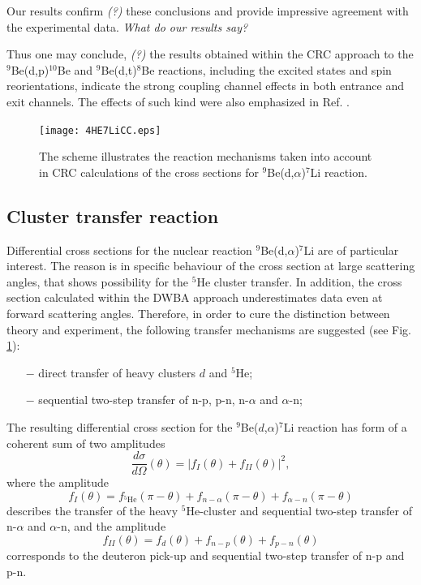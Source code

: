 \documentclass[10pt]{iopart}
\begin{document}
Our results confirm \textit{(?)} these conclusions and provide impressive agreement with the experimental data. \textit{What do our results say?}

Thus one may conclude, \textit{(?)} the results obtained within the CRC approach to the ${}^9$Be(d,p)${}^{10}$Be and ${}^9$Be(d,t)${}^{8}$Be reactions, including the excited states and spin reorientations, indicate the strong coupling channel effects in both entrance and exit channels. The effects of such kind were also emphasized in Ref. \cite{harakeh1980, rudchik2016}.

\begin{figure}[tp]
\centering
\texttt{[image: 4HE7LiCC.eps]}
\caption{\label{4He7LICC} The scheme illustrates the reaction mechanisms taken into account in CRC calculations of the cross sections for ${}^9$Be(d,$\alpha$)${}^7$Li reaction.}
\end{figure}	

\subsection{Cluster transfer reaction}
Differential cross sections for the nuclear reaction ${^9}$Be(d,$\alpha$)${}^7$Li are of particular interest. The reason is in specific behaviour of the cross section at large scattering angles, that shows possibility for the ${}^5$He cluster transfer. In addition, the cross section calculated within the DWBA approach underestimates data even at forward scattering angles. Therefore, in order to cure the distinction between theory and experiment, the following transfer mechanisms are suggested (see Fig. \ref{4He7LICC}):
\begin{itemize}
\item[$-$] direct transfer of heavy clusters $d$ and ${}^5$He;
\item[$-$] sequential two-step transfer of n-p, p-n, n-$\alpha$ and $\alpha$-n;
\end{itemize}

The resulting differential cross section for the ${^9}$Be($d$,$\alpha$)${}^7$Li reaction has form of a coherent sum of two amplitudes
\begin{equation}
\frac{d\sigma}{d\Omega}(\theta) =\vert f_{I}(\theta) + f_{II}(\theta) \vert ^2,
\end{equation}
where the amplitude
\begin{equation} \label{eq:ampl1}
f_{I}(\theta)=f_{{}^5\textrm{He}}(\pi - \theta) + f_{n-\alpha}(\pi - \theta) + f_{\alpha-n}(\pi - \theta)
\end{equation}
describes the transfer of the heavy ${}^5$He-cluster and sequential two-step transfer of n-$\alpha$ and $\alpha$-n, and the amplitude
\begin{equation} \label{eq:ampl2}
f_{II}(\theta)=f_{d}(\theta) + f_{n-p}( \theta) + f_{p-n}(\theta)
\end{equation}
corresponds to the deuteron pick-up and sequential two-step transfer of n-p and p-n.
\end{document}
